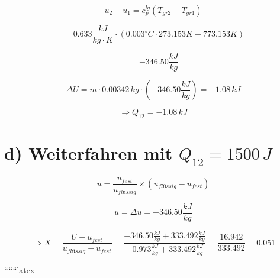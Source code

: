 \[
u_2 - u_1 = c_p^{lg} (T_{gr2} - T_{gr1})
\]

\[
= 0.633 \frac{kJ}{kg \cdot K} \cdot (0.003^\circ C \cdot 273.153 K - 773.153 K)
\]

\[
= -346.50 \frac{kJ}{kg}
\]

\[
\Delta U = m \cdot 0.00342 \, kg \cdot (-346.50 \frac{kJ}{kg}) = -1.08 \, kJ
\]

\[
\Rightarrow Q_{12} = -1.08 \, kJ
\]

\section*{d) Weiterfahren mit $Q_{12} = 1500 \, J$}

\[
u = \frac{u_{fest}}{u_{flüssig}} \times (u_{flüssig} - u_{fest})
\]

\[
u = \Delta u = -346.50 \frac{kJ}{kg}
\]

\[
\Rightarrow X = \frac{U - u_{fest}}{u_{flüssig} - u_{fest}} = \frac{-346.50 \frac{kJ}{kg} + 333.492 \frac{kJ}{kg}}{-0.973 \frac{kJ}{kg} + 333.492 \frac{kJ}{kg}} = \frac{16.942}{333.492} = 0.051
\]

``````latex


